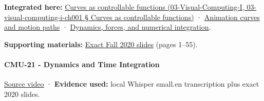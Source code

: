 \textbf{Integrated here:} \href{}{Curves as controllable functions (03-Visual-Computing-I, 03-visual-computing-i-ch001 § Curves as controllable functions)} · \hyperref[04-visual-computing-ii-ch029]{Animation curves and motion paths} · \hyperref[04-visual-computing-ii-ch029]{Dynamics, forces, and numerical integration}.

\textbf{Supporting materials:} \href{https://15462.courses.cs.cmu.edu/fall2020content/lectures/20_introanimation/20_introanimation_slides.pdf}{Exact Fall 2020 slides} (pages 1--55).

\paragraph{CMU-21 - Dynamics and Time Integration}\label{cmu-21---dynamics-and-time-integration}

\href{https://www.youtube.com/watch?v=Fi9xu3z97W4}{Source video} · \textbf{Evidence used:} local Whisper small.en transcription plus exact 2020 slides.

